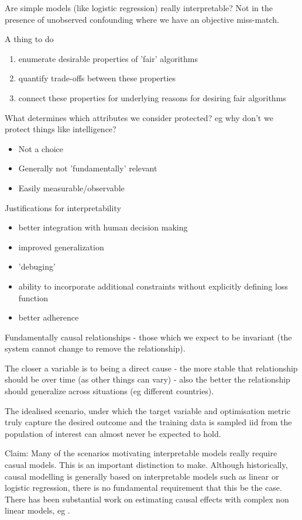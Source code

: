 \documentclass{article}
\theoremstyle{plain}
\theoremstyle{definition}
\begin{document}
Are simple models (like logistic regression) really interpretable? Not in the presence of unobserved confounding where we have an objective miss-match.

A thing to do
\begin{enumerate}
\item enumerate desirable properties of 'fair' algorithms
\item quantify trade-offs between these properties
\item connect these properties for underlying reasons for desiring fair algorithms
\end{enumerate}



What determines which attributes we consider protected? eg why don't we protect things like intelligence?
\begin{itemize}
\item Not a choice
\item Generally not 'fundamentally' relevant 
\item Easily measurable/observable
\end{itemize}

Justifications for interpretability
\begin{itemize}
\item  better integration with human decision making
\item improved generalization
\item 'debuging'
\item ability to incorporate additional constraints without explicitly defining loss function
\item better adherence
\end{itemize}


Fundamentally causal relationships - those which we expect to be invariant (the system cannot change to remove the relationship).

The closer a variable is to being a direct cause - the more stable that relationship should  be over time (as other things can vary) - also the better the relationship should generalize across situations (eg different countries). 

The idealised scenario, under which the target variable and optimisation metric truly capture the desired outcome and the training data is sampled iid from the population of interest can almost never be expected to hold. 

Claim: Many of the scenarios motivating interpretable models really require casual models. This is an important distinction to make. Although historically, causal modelling is generally based on interpretable models such as linear or logistic regression, there is no fundamental requirement that this be the case. There has been substantial work on estimating causal effects with complex non linear models, eg \cite{}.
\end{document}
